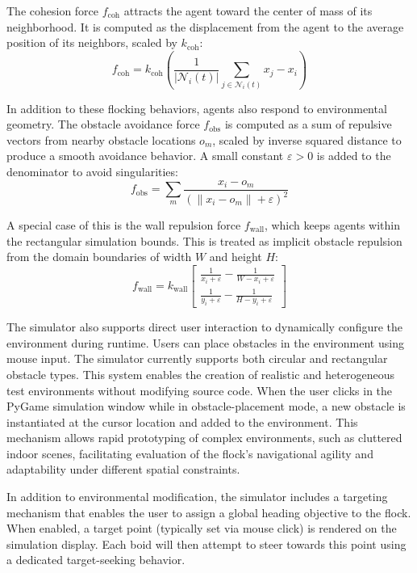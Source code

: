 \documentclass[12pt]{article}
\begin{document}
The cohesion force \(f_\text{coh}\) attracts the agent toward the center of mass of its neighborhood. It is computed as the displacement from the agent to the average position of its neighbors, scaled by \(k_\text{coh}\): 
\begin{equation} f_\text{coh} = k_\text{coh} \left( \frac{1}{|\mathcal{N}_i(t)|} \sum_{j \in \mathcal{N}_i(t)} x_j - x_i \right) \end{equation}

In addition to these flocking behaviors, agents also respond to environmental geometry. The obstacle avoidance force \(f_{\text{obs}}\) is computed as a sum of repulsive vectors from nearby obstacle locations \(o_m\), scaled by inverse squared distance to produce a smooth avoidance behavior. A small constant \(\varepsilon > 0\) is added to the denominator to avoid singularities:
\begin{equation} f_\text{obs} = \sum_m \frac{x_i - o_m}{\left( \|x_i - o_m\| + \varepsilon \right)^2} \end{equation}

A special case of this is the wall repulsion force \(f_\text{wall}\), which keeps agents within the rectangular simulation bounds. This is treated as implicit obstacle repulsion from the domain boundaries of width \(W\) and height \(H\): \begin{equation} f_\text{wall} = k_\text{wall} \begin{bmatrix}
\frac{1}{x_i + \varepsilon} - \frac{1}{W - x_i + \varepsilon} \\
\frac{1}{y_i + \varepsilon} - \frac{1}{H - y_i + \varepsilon}
\end{bmatrix} \end{equation}

The simulator also supports direct user interaction to dynamically configure the environment during runtime. Users can place obstacles in the environment using mouse input. The simulator currently supports both circular and rectangular obstacle types. This system enables the creation of realistic and heterogeneous test environments without modifying source code. When the user clicks in the PyGame simulation window while in obstacle-placement mode, a new obstacle is instantiated at the cursor location and added to the environment. This mechanism allows rapid prototyping of complex environments, such as cluttered indoor scenes, facilitating evaluation of the flock's navigational agility and adaptability under different spatial constraints.

In addition to environmental modification, the simulator includes a targeting mechanism that enables the user to assign a global heading objective to the flock. When enabled, a target point (typically set via mouse click) is rendered on the simulation display. Each boid will then attempt to steer towards this point using a dedicated target-seeking behavior.
\end{document}
